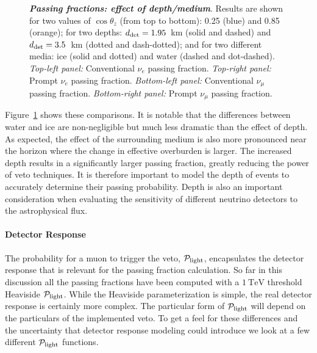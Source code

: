 \begin{figure}[h!]
{	}
	\caption{\textbf{\textit{Passing fractions: effect of depth/medium}}. Results are shown for two values of $\cos\theta_z$ (from top to bottom): 0.25 (blue) and 0.85 (orange); for two depths: $d_{\rm det} = 1.95$~km (solid and dashed) and $d_{\rm det} = 3.5$~km (dotted and dash-dotted); and for two different media: ice (solid and dotted) and water (dashed and dot-dashed). \textit{Top-left panel:} Conventional $\nu_e$ passing fraction. \textit{Top-right panel:} Prompt $\nu_e$ passing fraction. \textit{Bottom-left panel:} Conventional $\nu_\mu$ passing fraction. \textit{Bottom-right panel:} Prompt $\nu_\mu$ passing fraction.} \vspace{1.5cm}
	\label{fig:medium-effect}
\end{figure}

Figure~\ref{fig:medium-effect} shows these comparisons.
It is notable that the differences between water and ice are non-negligible but much less dramatic than the effect of depth.
As expected, the effect of the surrounding medium is also more pronounced near the horizon where the change in effective overburden is larger.
The increased depth results in a significantly larger passing fraction, greatly reducing the power of veto techniques.
It is therefore important to model the depth of events to accurately determine their passing probability.
Depth is also an important consideration when evaluating the sensitivity of different neutrino detectors to the astrophysical flux.

\paragraph{Detector Response}
The probability for a muon to trigger the veto, ${\cal P}_{\rm light}$, encapsulates the detector response that is relevant for the passing fraction calculation.
So far in this discussion all the passing fractions have been computed with a $\SI{1}\TeV$ threshold Heaviside ${\cal P}_{\rm light}$.
While the Heaviside parameterization is simple, the real detector response is certainly more complex.
The particular form of ${\cal P}_{\rm light}$ will depend on the particulars of the implemented veto.
To get a feel for these differences and the uncertainty that detector response modeling could introduce we look at a few different ${\cal P}_{\rm light}$ functions.

